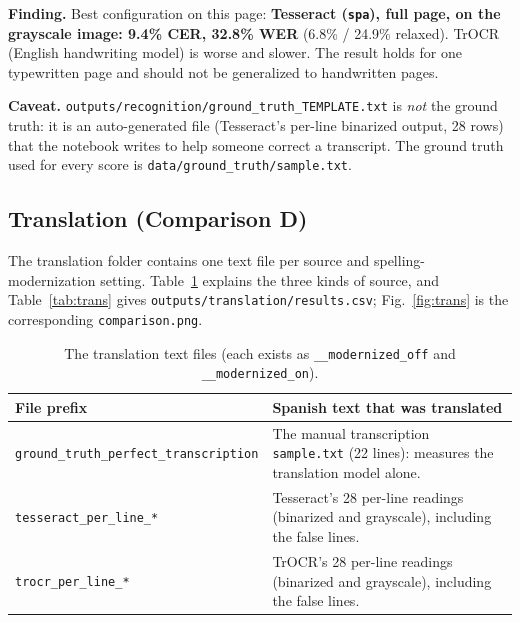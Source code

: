 \documentclass[10pt,twocolumn]{article}
\newcommand{\sample}{\texttt{sample.txt}}
\newcommand{\callout}[2]{%
  \par\medskip\noindent\colorbox{#1}{\parbox{\dimexpr\columnwidth-2\fboxsep}{\small #2}}\par\medskip}
\newcommand{\finding}[1]{\callout{softbox}{\textbf{Finding.} #1}}
\newcommand{\caveat}[1]{\callout{warnbox}{\textbf{Caveat.} #1}}
\begin{document}
\finding{Best configuration on this page: \textbf{Tesseract (\texttt{spa}), full page, on the grayscale image: 9.4\% CER, 32.8\% WER} (6.8\% / 24.9\% relaxed). TrOCR (English handwriting model) is worse and slower. The result holds for one typewritten page and should not be generalized to handwritten pages.}

\caveat{\texttt{outputs/recognition/ground\_\allowbreak{}truth\_\allowbreak{}TEMPLATE.txt} is \emph{not} the ground truth: it is an auto-generated file (Tesseract's per-line binarized output, 28 rows) that the notebook writes to help someone correct a transcript. The ground truth used for every score is \texttt{data/ground\_\allowbreak{}truth/sample.txt}.}

\subsection{Translation (Comparison D)}\label{sec:trans}
The translation folder contains one text file per source and spelling-modernization setting. Table~\ref{tab:files} explains the three kinds of source, and Table~\ref{tab:trans} gives \texttt{outputs/translation/results.csv}; Fig.~\ref{fig:trans} is the corresponding \texttt{comparison.png}.

\begin{table}[t]
\centering\small
\caption{The translation text files (each exists as \texttt{\_\allowbreak{}\_\allowbreak{}modernized\_\allowbreak{}off} and \texttt{\_\allowbreak{}\_\allowbreak{}modernized\_\allowbreak{}on}).}\label{tab:files}
\begin{tabular}{@{}p{}p{}@{}}
\toprule
\textbf{File prefix} & \textbf{Spanish text that was translated}\\
\midrule
\texttt{ground\_\allowbreak{}truth\_\allowbreak{}perfect\_\allowbreak{}transcription} & The manual transcription \sample{} (22 lines): measures the translation model alone.\\
\texttt{tesseract\_\allowbreak{}per\_\allowbreak{}line\_\allowbreak{}*} & Tesseract's 28 per-line readings (binarized and grayscale), including the false lines.\\
\texttt{trocr\_\allowbreak{}per\_\allowbreak{}line\_\allowbreak{}*} & TrOCR's 28 per-line readings (binarized and grayscale), including the false lines.\\
\bottomrule
\end{tabular}
\end{table}
\end{document}

